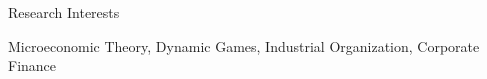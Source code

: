 

\begin{rSection}{Research Interests}

Microeconomic Theory, 
Dynamic Games, 
Industrial Organization,
Corporate Finance

\end{rSection}


